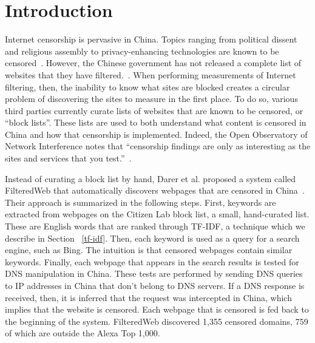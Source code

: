 
\section{Introduction} 

Internet censorship is pervasive in China. Topics ranging from
political dissent and religious assembly to privacy-enhancing
technologies are known to be
censored~\cite{citizenlab:block}. However, the Chinese government has
not released a complete list of websites that they have
filtered.~\cite{fhouse:china}. When performing measurements of
Internet filtering, then, the inability to know what sites are blocked
creates a circular problem of discovering the sites to measure in the
first place. To do so, various third parties currently curate lists of
websites that are known to be censored, or ``block lists''. These
lists are used to both understand {what} content is censored in China
and how that censorship is implemented. Indeed, the Open Observatory
of Network Interference notes that ``censorship findings are only as
interesting as the sites and services that you
test.''~\cite{ooni:lists}.

Instead of curating a block list by hand, Darer et al. proposed a
system called FilteredWeb that automatically discovers webpages that
are censored in China~\cite{darer2017filteredweb}. Their approach is
summarized in the following steps. First, keywords are extracted from
webpages on the Citizen Lab block list, a small, hand-curated
list. These are English words that are ranked through TF-IDF, a
technique which we describe in Section ~\ref{tf-idf}. Then, each
keyword is used as a query for a search engine, such as Bing. The
intuition is that censored webpages contain similar keywords. Finally,
each webpage that appears in the search results is tested for DNS
manipulation in China. These tests are performed by sending DNS
queries to IP addresses in China that don't belong to DNS servers. If
a DNS response is received, then, it is inferred that the request was
intercepted in China, which implies that the website is censored. Each
webpage that is censored is fed back to the beginning of the
system. FilteredWeb discovered 1,355 censored domains, 759 of which
are outside the Alexa Top 1,000.

